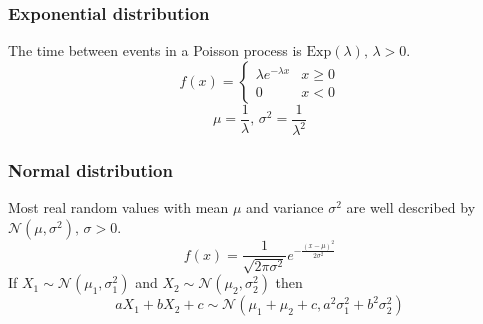 \documentclass[
	a4paper,
	landscape,
	10pt,
]{article}
\begin{document}
\begin{multicols}{3}
\subsubsection*{Exponential distribution}
The time between events in a Poisson process is $\textrm{Exp}(\lambda),\,\lambda>0$.
\[f(x) = \left\{
\begin{array}{cl}
\lambda e^{-\lambda x} & x\geq0\\
0 & x<0
\end{array}\right.\]
\[\mu=\frac{1}{\lambda},\,\sigma^2=\frac{1}{\lambda^2}\]

\subsubsection*{Normal distribution}
Most real random values with mean $\mu$ and variance $\sigma^2$ are well described by $\mathcal{N}(\mu,\sigma^2),\,\sigma>0$.
\[ f(x) = \frac{1}{\sqrt{2\pi\sigma^2}}e^{-\frac{(x-\mu)^2}{2\sigma^2}} \]
If $X_1 \sim \mathcal{N}(\mu_1,\sigma_1^2)$ and $X_2 \sim \mathcal{N}(\mu_2,\sigma_2^2)$ then
\[ aX_1 + bX_2 + c \sim \mathcal{N}(\mu_1+\mu_2+c,a^2\sigma_1^2+b^2\sigma_2^2) \]

\end{multicols}
\end{document}
